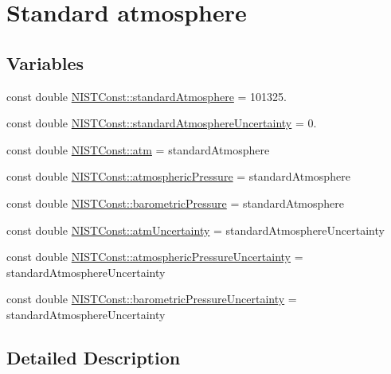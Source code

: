 \hypertarget{group___n_i_s_t_const-_standard_atmosphere}{}\section{Standard atmosphere}
\label{group___n_i_s_t_const-_standard_atmosphere}
\subsection*{Variables}
\begin{DoxyCompactItemize}
\item 
const double \hyperlink{group___n_i_s_t_const-_standard_atmosphere_ga260e00232ff2d0d8a24bdbf7f6c87b4e}{N\+I\+S\+T\+Const\+::standard\+Atmosphere} = 101325.
\item 
const double \hyperlink{group___n_i_s_t_const-_standard_atmosphere_ga784dc63051d7f1dca50f4f2843c8fbcf}{N\+I\+S\+T\+Const\+::standard\+Atmosphere\+Uncertainty} = 0.
\item 
const double \hyperlink{group___n_i_s_t_const-_standard_atmosphere_ga93a81873c4680c07e0a212604ce6e106}{N\+I\+S\+T\+Const\+::atm} = standard\+Atmosphere
\item 
const double \hyperlink{group___n_i_s_t_const-_standard_atmosphere_gab92a3a9d0d82fc926390602e825afea5}{N\+I\+S\+T\+Const\+::atmospheric\+Pressure} = standard\+Atmosphere
\item 
const double \hyperlink{group___n_i_s_t_const-_standard_atmosphere_ga09e2a2bce1e1f38985f98c22d5a8d43d}{N\+I\+S\+T\+Const\+::barometric\+Pressure} = standard\+Atmosphere
\item 
const double \hyperlink{group___n_i_s_t_const-_standard_atmosphere_gace6ef7e45b2b26b9f48c8495d8a349d0}{N\+I\+S\+T\+Const\+::atm\+Uncertainty} = standard\+Atmosphere\+Uncertainty
\item 
const double \hyperlink{group___n_i_s_t_const-_standard_atmosphere_gab6ab2c05e40b36d9e6284e8ebaceed37}{N\+I\+S\+T\+Const\+::atmospheric\+Pressure\+Uncertainty} = standard\+Atmosphere\+Uncertainty
\item 
const double \hyperlink{group___n_i_s_t_const-_standard_atmosphere_gaf437683a9ddd84a22147c418405d41f2}{N\+I\+S\+T\+Const\+::barometric\+Pressure\+Uncertainty} = standard\+Atmosphere\+Uncertainty
\end{DoxyCompactItemize}


\subsection{Detailed Description}


